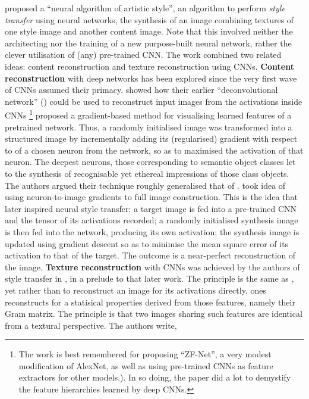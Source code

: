 \cite{gatys2016image} proposed a ``neural algorithm of artistic style'', an algorithm to perform \emph{style transfer} using neural networks, the synthesis of an image combining textures of one style image and another content image. Note that this involved neither the architecting nor the training of a new purpose-built neural network, rather the clever utilisation of (any) pre-trained CNN. The work combined two related ideas: content reconstruction and texture reconstruction using CNNs. \textbf{Content reconstruction} with deep networks has been explored since the very first wave of CNNs assumed their primacy. \cite{zeiler2014visualizing} showed how their earlier ``deconvolutional network'' (\cite{zeiler2010deconvolutional}) could be used to reconstruct input images from the activations inside CNNs \footnote{The work is best remembered for proposing ``ZF-Net'', a very modest modification of AlexNet, as well as using pre-trained CNNs as feature extractors for other models.). In so doing, the paper did a lot to demystify the feature hierarchies learned by deep CNNs.} \cite{simonyan2013deep} proposed a gradient-based method for visualising learned features of a pretrained network. Thus, a randomly initialised image was transformed into a structured image by incrementally adding its (regularised) gradient with respect to of a chosen neuron from the network, so as to maximised the activation of that neuron. The deepest neurons, those corresponding to semantic object classes let to the synthesis of recognisable yet ethereal impressions of those class objects. The authors argued their technique roughly generalised that of \cite{zeiler2014visualizing}. \cite{mahendran2015understanding} took idea of using neuron-to-image gradients to full image construction. This is the idea that later inspired neural style transfer: a target image is fed into a pre-trained CNN and the tensor of its activations recorded; a randomly initialised synthesis image is then fed into the network, producing its own activation; the synthesis image is updated using gradient descent so as to minimise the mean square error of its activation to that of the target. The outcome is a near-perfect reconstruction of the image. \textbf{Texture reconstruction} with CNNs was achieved by the authors of style transfer in \cite{gatys2015texture}, in a prelude to that later work. The principle is the same as \cite{mahendran2015understanding}, yet rather than to reconstruct an image for its activations directly, ones reconstructs for a statisical properties derived from those features, namely their Gram matrix. The principle is that two images sharing such features are identical from a textural perspective. The authors write,

